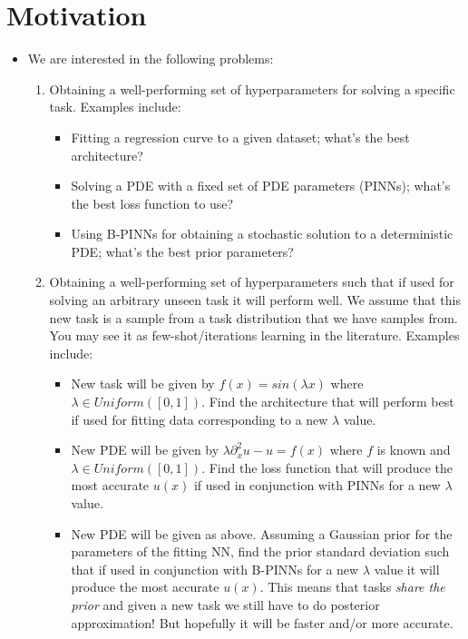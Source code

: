\section{Motivation}\label{sec:motivation}
\begin{itemize}
	\item We are interested in the following problems:
	\begin{enumerate}[font={\bfseries},label={Problem (\arabic*):}]
		\item Obtaining a well-performing set of hyperparameters for solving a specific task. Examples include:
		\begin{itemize}
			\item Fitting a regression curve to a given dataset; what's the best architecture?
			\item Solving a PDE with a fixed set of PDE parameters (PINNs); what's the best loss function to use?
			\item Using B-PINNs for obtaining a stochastic solution to a deterministic PDE; what's the best prior parameters?
		\end{itemize}
		\item Obtaining a well-performing set of hyperparameters such that if used for solving an arbitrary unseen task it will perform well. 
		We assume that this new task is a sample from a task distribution that we have samples from. 
		You may see it as few-shot/iterations learning in the literature.
		Examples include:
		\begin{itemize}
			\item New task will be given by $f(x) = sin(\lambda x)$ where $\lambda \in Uniform([0, 1])$. 
			Find the architecture that will perform best if used for fitting data corresponding to a new $\lambda$ value.
			\item New PDE will be given by $\lambda \partial_x^2 u - u = f(x)$ where $f$ is known and $\lambda \in Uniform([0, 1])$.
			Find the loss function that will produce the most accurate $u(x)$ if used in conjunction with PINNs for a new $\lambda$ value.
			\item New PDE will be given as above.
			Assuming a Gaussian prior for the parameters of the fitting NN, find the prior standard deviation such that if used in conjunction with B-PINNs for a new $\lambda$ value it will produce the most accurate $u(x)$.
			This means that tasks \textit{share the prior} and given a new task we still have to do posterior approximation! 
			But hopefully it will be faster and/or more accurate. 
		\end{itemize}

\end{enumerate}
\end{itemize}
